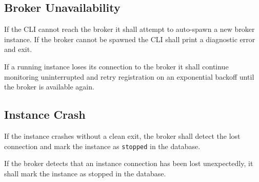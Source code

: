 \documentclass{article}
\begin{document}
\subsection{Broker Unavailability}
If the CLI cannot reach the broker it shall attempt to auto-spawn a new
broker instance. If the broker cannot be spawned the CLI shall print a
diagnostic error and exit.

If a running instance loses its connection to the broker it shall continue
monitoring uninterrupted and retry registration on an exponential backoff
until the broker is available again.

\subsection{Instance Crash}
If the instance crashes without a clean exit, the broker shall detect the lost
connection and mark the instance as \texttt{stopped} in the database.

If the broker detects that an instance connection has been lost unexpectedly,
it shall mark the instance as stopped in the database.
\end{document}

